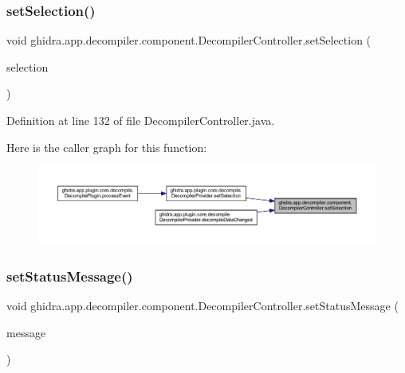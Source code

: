 \subsubsection{\texorpdfstring{setSelection()}{setSelection()}}
{\footnotesize\ttfamily void ghidra.\+app.\+decompiler.\+component.\+Decompiler\+Controller.\+set\+Selection (\begin{DoxyParamCaption}\item[{Program\+Selection}]{selection }\end{DoxyParamCaption})\hspace{0.3cm}{\ttfamily [inline]}}



Definition at line 132 of file Decompiler\+Controller.\+java.

Here is the caller graph for this function\+:
\nopagebreak
\begin{figure}[H]
\begin{center}
\leavevmode
\includegraphics[width=350pt]{classghidra_1_1app_1_1decompiler_1_1component_1_1_decompiler_controller_ab8b004d5f993e1514406f07c0878794e_icgraph}
\end{center}
\end{figure}
\mbox{\label{classghidra_1_1app_1_1decompiler_1_1component_1_1_decompiler_controller_a7f9c30484cff31540728dac99886488e}} 
\subsubsection{\texorpdfstring{setStatusMessage()}{setStatusMessage()}}
{\footnotesize\ttfamily void ghidra.\+app.\+decompiler.\+component.\+Decompiler\+Controller.\+set\+Status\+Message (\begin{DoxyParamCaption}\item[{String}]{message }\end{DoxyParamCaption})\hspace{0.3cm}{\ttfamily [inline]}}



